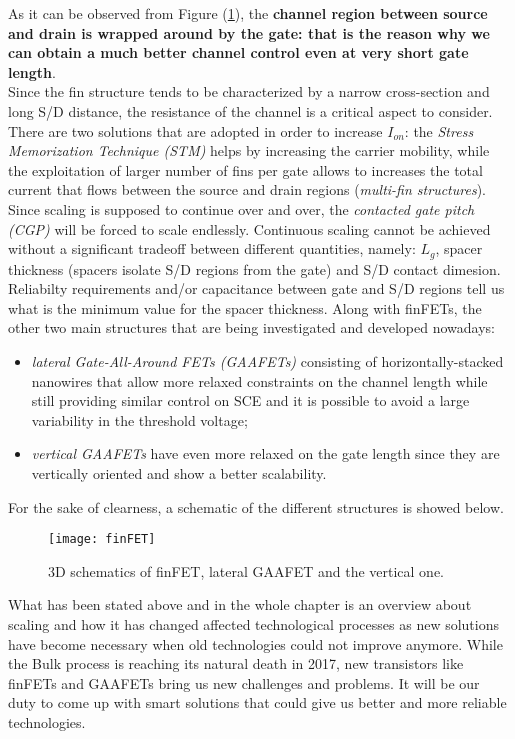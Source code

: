 \documentclass[a4paper, 12pt, twoside, openright]{report}
\begin{document}
As it can be observed from Figure (\ref{fig:finFET}), the \textbf{channel region between source and drain is wrapped around by the gate: that is the reason why we can obtain a much better channel control even at very short gate length}.\\
Since the fin structure tends to be characterized by a narrow cross-section and long S/D distance, the resistance of the channel is a critical aspect to consider. There are two solutions that are adopted in order to increase $I_{on}$: the \emph{Stress Memorization Technique (STM)} helps by increasing the carrier mobility, while the exploitation of larger number of fins per gate allows to increases the total current that flows between the source and drain regions (\emph{multi-fin structures}).
Since scaling is supposed to continue over and over, the \emph{contacted gate pitch (CGP)} will be forced to scale endlessly. Continuous scaling cannot be achieved without a significant tradeoff between different quantities, namely: $L_{g}$, spacer thickness (spacers isolate S/D regions from the gate) and S/D contact dimesion. 
Reliabilty requirements and/or capacitance between gate and S/D regions tell us what is the minimum value for the spacer thickness. Along with finFETs, the other two main structures that are being investigated and developed nowadays:

\begin{itemize}
\item \emph{lateral Gate-All-Around FETs (GAAFETs)} consisting of horizontally-stacked nanowires that allow more relaxed constraints on the channel length while still providing similar control on SCE and it is possible to avoid a large variability in the threshold voltage;
\item \emph{vertical GAAFETs} have even more relaxed on the gate length since they are vertically oriented and show a better scalability. 
\end{itemize}

For the sake of clearness, a schematic of the different structures is showed below.
\begin{figure}[h]
\centering
\texttt{[image: finFET]}
\caption{3D schematics of finFET, lateral GAAFET and the vertical one.}
\label{fig:finFET}
\end{figure} 

What has been stated above and in the whole chapter is an overview about scaling and how it has changed affected technological processes as new solutions have become necessary when old technologies could not improve anymore. While the Bulk process is reaching its natural death in 2017, new transistors like finFETs and GAAFETs bring us new challenges and problems. It will be our duty to come up with smart solutions that could give us better and more reliable technologies. 

\end{document}
